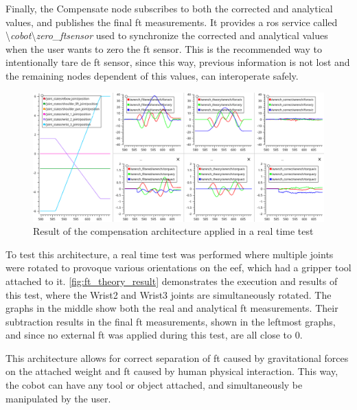 \par Finally, the Compensate node subscribes to both the corrected and analytical values, and publishes the final \ac{ft} measurements. It provides a \ac{ros} service called \textbackslash \textit{cobot}\textbackslash\textit{zero\_ftsensor} used to synchronize the corrected and analytical values when the user wants to zero the \ac{ft} sensor. This is the recommended way to intentionally tare de \ac{ft} sensor, since this way, previous information is not lost and the remaining nodes dependent of this values, can interoperate safely.

\begin{figure}[h]
    \centering
    \includegraphics[width=0.9\linewidth]{figs/chp3/ft_sensor_theory_result.png}
    \caption{Result of the compensation architecture applied in a real time test}
    \label{fig:ft_theory_result}
\end{figure}

\par To test this architecture, a real time test was performed where multiple joints were rotated to provoque various orientations on the \ac{eef}, which had a gripper tool attached to it. \autoref{fig:ft_theory_result} demonstrates the execution and results of this test, where the Wrist2 and Wrist3 joints are simultaneously rotated. The graphs in the middle show both the real and analytical \ac{ft} measurements. Their subtraction results in the final \ac{ft} measurements, shown in the leftmost graphs, and since no external \ac{ft} was applied during this test, are all close to 0.

\par This architecture allows for correct separation of \ac{ft} caused by gravitational forces on the attached weight and \ac{ft} caused by human physical interaction. This way, the cobot can have any tool or object attached, and simultaneously be manipulated by the user.

